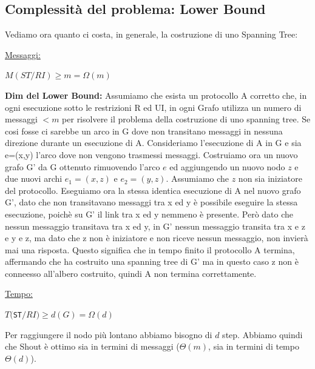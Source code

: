 \subsection{Complessità del problema: Lower Bound}
Vediamo ora quanto ci costa, in generale, la costruzione di uno Spanning Tree:

\underline{Messaggi:}
\begin{center}
  $M(ST/RI) \geq m = \Omega(m)$
\end{center}
\textbf{Dim del Lower Bound:} 
Assumiamo che esista un protocollo A corretto che, in ogni esecuzione sotto le restrizioni R ed UI, in ogni Grafo utilizza un numero di messaggi $<m$ per risolvere il problema della costruzione di uno spanning tree. Se cosi fosse ci sarebbe un arco in G dove non transitano messaggi in nessuna direzione durante un esecuzione di A. Consideriamo l'esecuzione di A in G e sia e=(x,y) l'arco dove non vengono trasmessi messaggi. Costruiamo ora un nuovo grafo G' da G ottenuto rimuovendo l'arco $e$ ed aggiungendo un nuovo nodo $z$ e due nuovi archi $e_1=(x,z)$ e $e_2=(y,z)$. Assumiamo che $z$ non sia iniziatore del protocollo. Eseguiamo ora la stessa identica esecuzione di A nel nuovo grafo G', dato che non transitavano messaggi tra x ed y è possibile eseguire la stessa esecuzione, poichè su G' il link tra x ed y nemmeno è presente. Però dato che nessun messaggio transitava tra x ed y, in G' nessun messaggio transita tra x e z e y e z, ma dato che z non è iniziatore e non riceve nessun messaggio, non invierà mai una risposta. Questo significa che in tempo finito il protocollo A termina, affermando che ha costruito una spanning tree di G' ma in questo caso z non è conneesso all'albero costruito, quindi A non termina correttamente.

\underline{Tempo:}
\begin{center}
  $T($\texttt{ST}$/RI) \geq d(G) = \Omega(d)$
\end{center}
Per raggiungere il nodo più lontano abbiamo bisogno di $d$ step.
Abbiamo quindi che Shout è ottimo sia in termini di messaggi ($\Theta(m)$, sia in termini di tempo $\Theta(d)$).

